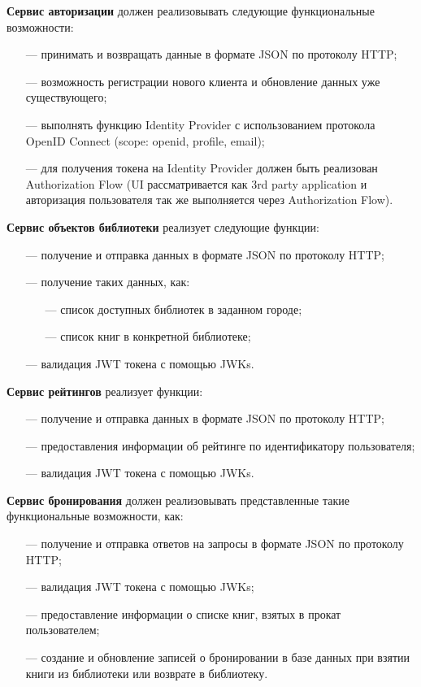 \documentclass[a4paper, 12pt]{article}
\begin{document}
\begin{large}
\textbf{Сервис авторизации} должен реализовывать следующие функциональные возможности:
\begin{itemize}
	\item[---] принимать и возвращать данные в формате JSON по протоколу HTTP;
	\item[---] возможность регистрации нового клиента и обновление данных уже существующего;
	\item[---] выполнять функцию Identity Provider с использованием протокола OpenID Connect (scope: openid, profile, email);
	\item[---] для получения токена на Identity Provider должен быть реализован Authorization Flow (UI рассматривается как 3rd party application и авторизация пользователя так же выполняется через Authorization Flow).
\end{itemize}

\textbf{Сервис объектов библиотеки} реализует следующие функции:
\begin{itemize}
	\item[---] получение и отправка данных в формате JSON по протоколу HTTP;
	\item[---] получение таких данных, как:
	\begin{itemize}
		\item[---] список доступных библиотек в заданном городе;
		\item[---] список книг в конкретной библиотеке;
	\end{itemize}
	\item[---] валидация JWT токена с помощью JWKs.
\end{itemize}

\textbf{Сервис рейтингов} реализует функции:
\begin{itemize}
	\item[---] получение и отправка данных в формате JSON по протоколу HTTP;
	\item[---] предоставления информации об рейтинге по идентификатору пользователя;
	\item[---] валидация JWT токена с помощью JWKs.
\end{itemize}

\textbf{Сервис бронирования} должен реализовывать представленные такие функциональные возможности, как:
\begin{itemize}
	\item[---] получение и отправка ответов на запросы в формате JSON по протоколу HTTP;
	\item[---] валидация JWT токена с помощью JWKs;
	\item[---] предоставление информации о списке книг, взятых в прокат пользователем;
    \item[---] создание и обновление записей о бронировании в базе данных при взятии книги из библиотеки или возврате в библиотеку.
\end{itemize}


\end{large}
\end{document}
